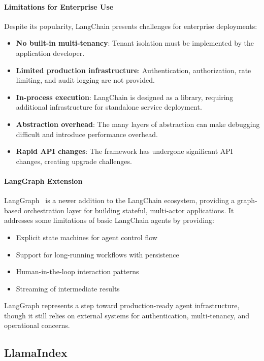 \paragraph{Limitations for Enterprise Use}
Despite its popularity, LangChain presents challenges for enterprise deployments:
\begin{itemize}
    \item \textbf{No built-in multi-tenancy}: Tenant isolation must be implemented by the application developer.
    \item \textbf{Limited production infrastructure}: Authentication, authorization, rate limiting, and audit logging are not provided.
    \item \textbf{In-process execution}: LangChain is designed as a library, requiring additional infrastructure for standalone service deployment.
    \item \textbf{Abstraction overhead}: The many layers of abstraction can make debugging difficult and introduce performance overhead.
    \item \textbf{Rapid API changes}: The framework has undergone significant API changes, creating upgrade challenges.
\end{itemize}

\paragraph{LangGraph Extension}
LangGraph~%
is a newer addition to the LangChain ecosystem, providing a graph-based orchestration layer for building stateful, multi-actor applications. It addresses some limitations of basic LangChain agents by providing:
\begin{itemize}
    \item Explicit state machines for agent control flow
    \item Support for long-running workflows with persistence
    \item Human-in-the-loop interaction patterns
    \item Streaming of intermediate results
\end{itemize}

LangGraph represents a step toward production-ready agent infrastructure, though it still relies on external systems for authentication, multi-tenancy, and operational concerns.

\subsection{LlamaIndex}

